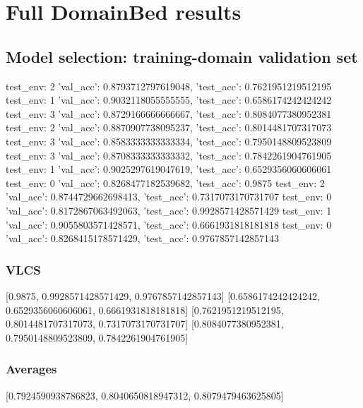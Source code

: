 \documentclass{article}
\begin{document}
\section{Full DomainBed results}

\subsection{Model selection: training-domain validation set}
test_env: 2
{'val_acc': 0.8793712797619048, 'test_acc': 0.7621951219512195}
test_env: 1
{'val_acc': 0.9032118055555555, 'test_acc': 0.6586174242424242}
test_env: 3
{'val_acc': 0.8729166666666667, 'test_acc': 0.8084077380952381}
test_env: 2
{'val_acc': 0.8870907738095237, 'test_acc': 0.8014481707317073}
test_env: 3
{'val_acc': 0.8583333333333334, 'test_acc': 0.7950148809523809}
test_env: 3
{'val_acc': 0.8708333333333332, 'test_acc': 0.7842261904761905}
test_env: 1
{'val_acc': 0.9025297619047619, 'test_acc': 0.6529356060606061}
test_env: 0
{'val_acc': 0.8268477182539682, 'test_acc': 0.9875}
test_env: 2
{'val_acc': 0.8744729662698413, 'test_acc': 0.7317073170731707}
test_env: 0
{'val_acc': 0.8172867063492063, 'test_acc': 0.9928571428571429}
test_env: 1
{'val_acc': 0.9055803571428571, 'test_acc': 0.6661931818181818}
test_env: 0
{'val_acc': 0.8268415178571429, 'test_acc': 0.9767857142857143}

\subsubsection{VLCS}
[0.9875, 0.9928571428571429, 0.9767857142857143]
[0.6586174242424242, 0.6529356060606061, 0.6661931818181818]
[0.7621951219512195, 0.8014481707317073, 0.7317073170731707]
[0.8084077380952381, 0.7950148809523809, 0.7842261904761905]

\begin{center}
\end{center}

\subsubsection{Averages}
[0.7924590938786823, 0.8040650818947312, 0.8079479463625805]

\begin{center}
\end{center}
\end{document}
